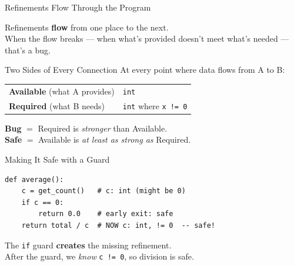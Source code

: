 \documentclass[aspectratio=169,10pt]{beamer}
\begin{document}
\begin{frame}{Refinements Flow Through the Program}
\begin{center}
\end{center}
\vspace{0.3em}
Refinements \textbf{flow} from one place to the next.\\
When the flow breaks --- when what's provided doesn't meet what's needed --- that's a bug.
\end{frame}

\begin{frame}{Two Sides of Every Connection}
At every point where data flows from A to B:
\vspace{0.3em}
\begin{center}
\begin{tabular}{@{}ll@{}}
\textbf{Available} (what A provides) & \texttt{int} \\
\textbf{Required} (what B needs)     & \texttt{int} where \texttt{x != 0} \\
\end{tabular}
\end{center}
\vspace{0.3em}
\textbf{Bug} $=$ Required is \emph{stronger} than Available.\\
\textbf{Safe} $=$ Available is \emph{at least as strong as} Required.
\end{frame}

\begin{frame}[fragile]{Making It Safe with a Guard}
\begin{lstlisting}
def average():
    c = get_count()   # c: int (might be 0)
    if c == 0:
        return 0.0    # early exit: safe
    return total / c  # NOW c: int, != 0  -- safe!
\end{lstlisting}
\vspace{0.3em}
The \texttt{if} guard \textbf{creates} the missing refinement.\\
After the guard, we \emph{know} \texttt{c != 0}, so division is safe.
\end{frame}
\end{document}
